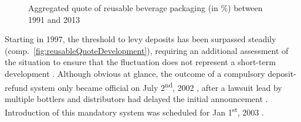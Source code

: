 \begin{figure}[hbt]
	\centering
  	\caption[Aggregated quote of reusable beverage packaging (in \%) between 1991 and 2013]{Aggregated quote of reusable beverage packaging (in \%) between 1991 and 2013 \cite{BMU2015} }
  	\label{fig:reusableQuoteDevelopment}
\end{figure}
\FloatBarrier


Starting in 1997, the threshold to levy deposits has been surpassed steadily (comp.~\autoref{fig:reusableQuoteDevelopment}), requiring an additional assessment of the situation to ensure that the fluctuation does not represent a short-term development \cite[§ 9]{verpackV1991} \cite[p.~5]{Hartlep2011Recycling}. Although obvious at glance, the outcome of a compulsory deposit-refund system only became official on July 2\textsuperscript{nd}, 2002 \cite[p.~49]{Geyer/Smoltczyk2003}, after a lawsuit lead by multiple bottlers and distributors had delayed the initial announcement \cite{spon2011handel}. Introduction of this mandatory system was scheduled for Jan 1\textsuperscript{st}, 2003 \cite[p.~53]{Geyer/Smoltczyk2003}.

